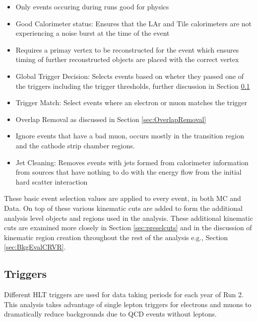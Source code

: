 \begin{itemize}
\item Only events occuring during runs good for physics
\item Good Calorimeter status: Ensures that the LAr and Tile calorimeters are not experiencing a noise burst at the time of the event
\item Requires a primay vertex to be reconstructed for the event which ensures timing of further reconstructed objects are placed with the correct vertex
\item Global Trigger Decision: Selects events based on wheter they passed one of the triggers including the trigger thresholds, further discussion in Section \ref{sec:GTRIGDEC}
\item Trigger Match: Select events where an electron or muon matches the trigger
\item Overlap Removal as discussed in Section \ref{sec:OverlapRemoval}
\item Ignore events that have a bad muon, occurs mostly in the transition region and the cathode strip chamber regions.
\item Jet Cleaning: Removes events with jets formed from calorimeter information from sources that have nothing to do with the energy flow from the initial hard scatter interaction
\end{itemize}

These basic event selection values are applied to every event, in both MC and Data.  On top of these various kinematic cuts are added to form the additional analysis level objects and regions used in the analysis.  These additional kinematic cuts are examined more closely in Section \ref{sec:preselcuts} and in the discussion of kinematic region creation throughout the rest of the analysis e.g., Section \ref{sec:BkgEvalCRVR}.


\subsection{Triggers}
\label{sec:GTRIGDEC}
Different HLT triggers are used for data taking periods for each year of Run 2.  This analysis takes advantage of single lepton triggers for electrons and muons to dramatically reduce backgrounds due to QCD events without leptons.  

